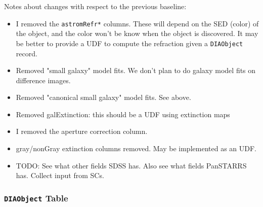 \documentclass[12pt]{article}
\newcommand{\code}[1]{\texttt{#1}}
\newcommand{\DIAObject}{\code{DIAObject}\xspace}
\begin{document}
\begin{changelog}
Notes about changes with respect to the previous baseline:
\begin{itemize}
\item I removed the \texttt{astromRefr*} columns. These will depend on the SED
      (color) of the object, and the color won't be know when the object is
      discovered. It may be better to provide a UDF to compute the refraction
      given a \DIAObject record.
\item Removed "small galaxy" model fits. We don't plan to do galaxy model fits
      on difference images.
\item Removed "canonical small galaxy" model fits. See above.
\item Removed galExtinction: this should be a UDF using extinction maps
\item I removed the aperture correction column.
\item gray/nonGray extinction columns removed. May be implemented as an UDF.
\item TODO: See what other fields SDSS has. Also see what fields PanSTARRS
      has. Collect input from SCs.
\end{itemize}
\end{changelog}

\subsubsection{\DIAObject Table}
\end{document}
